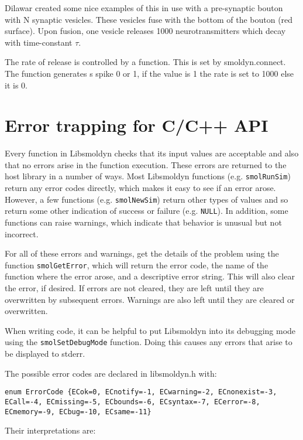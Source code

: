 \documentclass {book}
\newcommand {\ttt} {\texttt}
\begin{document}
Dilawar created some nice examples of this in use with a pre-synaptic bouton with N synaptic vesicles. These vesicles fuse with the bottom of the bouton (red surface). Upon fusion, one vesicle releases 1000 neurotransmitters which decay with time-constant $\tau$.

The rate of release is controlled by a function. This is set by smoldyn.connect. The function generates s spike 0 or 1, if the value is 1 the rate is set to 1000 else it is 0.

\chapter{Error trapping for C/C++ API}

Every function in Libsmoldyn checks that its input values are acceptable and also that no errors arise in the function execution. These errors are returned to the host library in a number of ways. Most Libsmoldyn functions (e.g. \ttt{smolRunSim}) return any error codes directly, which makes it easy to see if an error arose. However, a few functions (e.g. \ttt{smolNewSim}) return other types of values and so return some other indication of success or failure (e.g. \ttt{NULL}). In addition, some functions can raise warnings, which indicate that behavior is unusual but not incorrect.

For all of these errors and warnings, get the details of the problem using the function \ttt{smolGetError}, which will return the error code, the name of the function where the error arose, and a descriptive error string. This will also clear the error, if desired. If errors are not cleared, they are left until they are overwritten by subsequent errors. Warnings are also left until they are cleared or overwritten.

When writing code, it can be helpful to put Libsmoldyn into its debugging mode using the \ttt{smolSetDebugMode} function. Doing this causes any errors that arise to be displayed to stderr.

The possible error codes are declared in libsmoldyn.h with:

\begin{lstlisting}
enum ErrorCode {ECok=0, ECnotify=-1, ECwarning=-2, ECnonexist=-3, ECall=-4, ECmissing=-5, ECbounds=-6, ECsyntax=-7, ECerror=-8, ECmemory=-9, ECbug=-10, ECsame=-11}
\end{lstlisting}

Their interpretations are:
\end{document}
